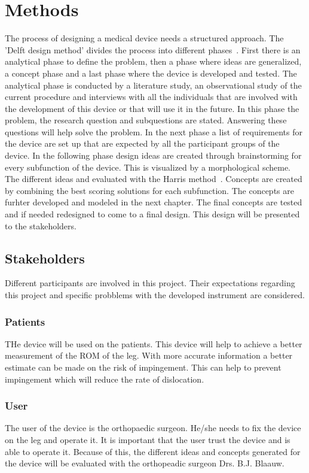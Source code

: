 \documentclass[whitelogo]{tudelft-report}
\begin{document}
{{\chapter{Methods}
The process of designing a medical device needs a structured approach. The 'Delft design method' divides the process into different phases~\cite{Delftdesignmethod}. First there is an analytical phase  to define the problem, then a phase where ideas  are generalized, a concept phase and a last phase where the device is developed and tested. The analytical phase is conducted by a literature study, an observational study of the current procedure and interviews with all the individuals that are involved with the development of this device or that will use it in the future. In this phase the problem, the research question and subquestions are stated. Answering these questions will help solve the problem. In the next phase a list of requirements for the device are set up that are expected by all the participant groups of the device. In the following phase design ideas are created through brainstorming for every subfunction of the device. This is visualized by a morphological scheme. The different ideas and evaluated with the Harris method~\cite{Harrisprofile}. Concepts are created by combining the best scoring solutions for each subfunction. The concepts are furhter developed and modeled in the next chapter. The final concepts are tested and if needed redesigned to come to a final design. This design will be presented to the stakeholders. 

\section{Stakeholders}
Different participants are involved in this project. Their expectations regarding this project and specific probblems with the developed instrument are considered.  

\subsection{Patients}
THe device will be used on the patients. This device will help to achieve a better measurement of the ROM of the leg. With more accurate information a better estimate can be made on the risk of impingement. This can help to prevent impingement which will reduce the rate of dislocation. 

\subsection{User}
The user of the device is the orthopaedic surgeon. He/she needs to fix the device on the leg and operate it. It  is important that the user trust the device and is able to operate it. Because of this, the different ideas and concepts generated for the device will be evaluated with the orthopeadic surgeon Drs. B.J. Blaauw.  

}}
\end{document}
